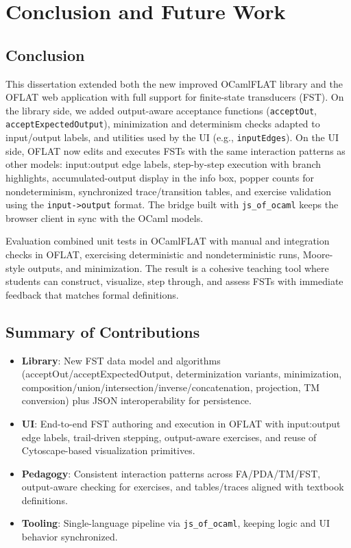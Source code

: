 %

\chapter{Conclusion and Future Work}
\label{cha:conclusion}

\section{Conclusion}
\label{sec:conclusion_summary}

This dissertation extended both the new improved OCamlFLAT library and the OFLAT web application with full support for finite-state
transducers (FST). On the library side, we added output-aware acceptance functions (\texttt{acceptOut},
\texttt{acceptExpectedOutput}), minimization and determinism checks adapted to input/output labels, and utilities used by
the UI (e.g., \texttt{inputEdges}). On the UI side, OFLAT now edits and executes FSTs with the same interaction patterns as
other models: input:output edge labels, step-by-step execution with branch highlights, accumulated-output display in the
info box, popper counts for nondeterminism, synchronized trace/transition tables, and exercise validation using the
\texttt{input->output} format. The bridge built with \texttt{js\_of\_ocaml} keeps the browser client in sync with the
OCaml models.

Evaluation combined unit tests in OCamlFLAT with manual and integration checks in OFLAT, exercising deterministic and
nondeterministic runs, Moore-style outputs, and minimization. The result is a cohesive teaching tool where students can
construct, visualize, step through, and assess FSTs with immediate feedback that matches formal definitions.

\section{Summary of Contributions}
\label{sec:conclusion_contrib}
\begin{itemize}
	\item \textbf{Library}: New FST data model and algorithms 
    (acceptOut/acceptExpectedOutput, determinization variants, minimization, 
    composition/union/intersection/inverse/concatenation, projection, TM conversion) 
    plus JSON interoperability for persistence.
	\item \textbf{UI}: End-to-end FST authoring and execution in OFLAT with input:output edge labels, 
    trail-driven stepping, output-aware exercises, and reuse of Cytoscape-based visualization primitives.
	\item \textbf{Pedagogy}: Consistent interaction patterns across FA/PDA/TM/FST, 
    output-aware checking for exercises, and tables/traces aligned with textbook definitions.
	\item \textbf{Tooling}: Single-language pipeline via \texttt{js\_of\_ocaml}, 
    keeping logic and UI behavior synchronized.
\end{itemize}

